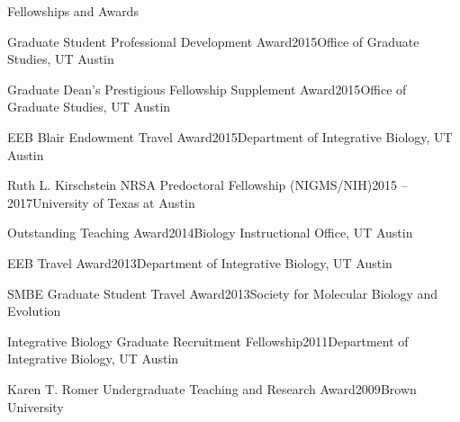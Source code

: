 \documentclass{resume} %
\begin{document}
\vspace*{0.5cm}
\begin{rSection}{Fellowships and Awards}
\vspace*{0.25cm}


\begin{rSubsection}{Graduate Student Professional Development Award}{2015}{Office of Graduate Studies, UT Austin}{}
\end{rSubsection}

\begin{rSubsection}{Graduate Dean's Prestigious Fellowship Supplement Award}{2015}{Office of Graduate Studies, UT Austin}{}
\end{rSubsection}

\begin{rSubsection}{EEB Blair Endowment Travel Award}{2015}{Department of Integrative Biology, UT Austin}{}
\end{rSubsection}

\begin{rSubsection}{Ruth L. Kirschstein NRSA Predoctoral Fellowship (NIGMS/NIH)}{2015 -- 2017}{University of Texas at Austin}
\end{rSubsection}

\begin{rSubsection}{Outstanding Teaching Award}{2014}{Biology Instructional Office, UT Austin}{}
\end{rSubsection}

\begin{rSubsection}{EEB Travel Award}{2013}{Department of Integrative Biology, UT Austin}{}
\end{rSubsection}

\begin{rSubsection}{SMBE Graduate Student Travel Award}{2013}{Society for Molecular Biology and Evolution}{}
\end{rSubsection}

\begin{rSubsection}{Integrative Biology Graduate Recruitment Fellowship}{2011}{Department of Integrative Biology, UT Austin}{}
\end{rSubsection}

\begin{rSubsection}{Karen T. Romer Undergraduate Teaching and Research Award}{2009}{Brown University}{}
\end{rSubsection}


\end{rSection}
\end{document}
